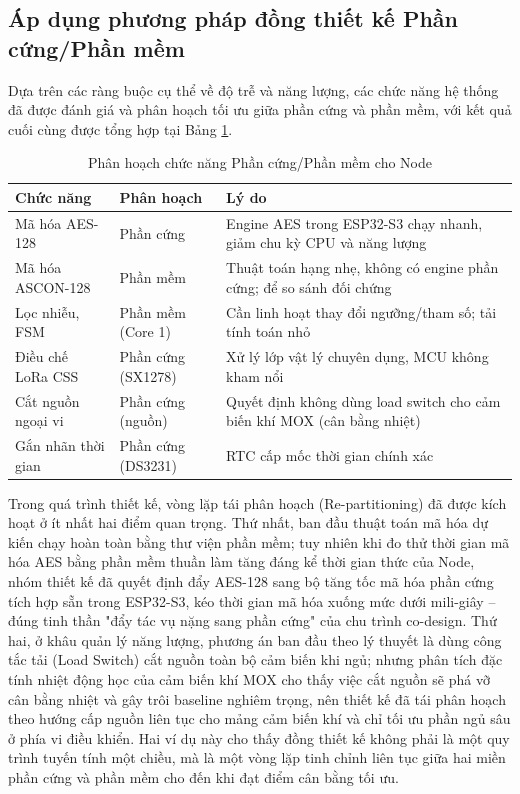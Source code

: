 \subsection{Áp dụng phương pháp đồng thiết kế Phần cứng/Phần mềm}
Dựa trên các ràng buộc cụ thể về độ trễ và năng lượng, các chức năng hệ thống đã được đánh giá và phân hoạch tối ưu giữa phần cứng và phần mềm, với kết quả cuối cùng được tổng hợp tại Bảng \ref{Bảng 3.7}.

\begin{table}[H]
\centering
\caption{Phân hoạch chức năng Phần cứng/Phần mềm cho Node}
\label{Bảng 3.7}
\renewcommand{\arraystretch}{1.4}
\begin{tabular}{p{3.5cm} p{4.5cm} p{6.5cm}}
\hline
\textbf{Chức năng} & \textbf{Phân hoạch} & \textbf{Lý do} \\ \hline
Mã hóa AES-128 & Phần cứng & Engine AES trong ESP32-S3 chạy nhanh, giảm chu kỳ CPU và năng lượng \\ 
Mã hóa ASCON-128 & Phần mềm & Thuật toán hạng nhẹ, không có engine phần cứng; để so sánh đối chứng \\ 
Lọc nhiễu, FSM & Phần mềm (Core 1) & Cần linh hoạt thay đổi ngưỡng/tham số; tải tính toán nhỏ \\ 
Điều chế LoRa CSS & Phần cứng (SX1278) & Xử lý lớp vật lý chuyên dụng, MCU không kham nổi \\ 
Cắt nguồn ngoại vi & Phần cứng (nguồn) & Quyết định không dùng load switch cho cảm biến khí MOX (cân bằng nhiệt) \\ 
Gắn nhãn thời gian & Phần cứng (DS3231) & RTC cấp mốc thời gian chính xác\\ \hline
\end{tabular}
\end{table}


Trong quá trình thiết kế, vòng lặp tái phân hoạch (Re-partitioning) đã được kích hoạt ở ít nhất hai điểm quan trọng. Thứ nhất, ban đầu thuật toán mã hóa dự kiến chạy hoàn toàn bằng thư viện phần mềm; tuy nhiên khi đo thử thời gian mã hóa AES bằng phần mềm thuần làm tăng đáng kể thời gian thức của Node, nhóm thiết kế đã quyết định đẩy AES-128 sang bộ tăng tốc mã hóa phần cứng tích hợp sẵn trong ESP32-S3, kéo thời gian mã hóa xuống mức dưới mili-giây -- đúng tinh thần "đẩy tác vụ nặng sang phần cứng" của chu trình co-design. Thứ hai, ở khâu quản lý năng lượng, phương án ban đầu theo lý thuyết là dùng công tắc tải (Load Switch) cắt nguồn toàn bộ cảm biến khi ngủ; nhưng phân tích đặc tính nhiệt động học của cảm biến khí MOX cho thấy việc cắt nguồn sẽ phá vỡ cân bằng nhiệt và gây trôi baseline nghiêm trọng, nên thiết kế đã tái phân hoạch theo hướng cấp nguồn liên tục cho mảng cảm biến khí và chỉ tối ưu phần ngủ sâu ở phía vi điều khiển. Hai ví dụ này cho thấy đồng thiết kế không phải là một quy trình tuyến tính một chiều, mà là một vòng lặp tinh chỉnh liên tục giữa hai miền phần cứng và phần mềm cho đến khi đạt điểm cân bằng tối ưu.
